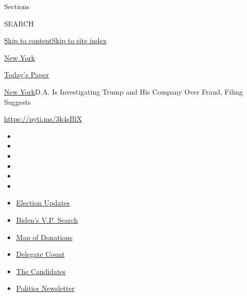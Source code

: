 Sections

SEARCH

\protect\hyperlink{site-content}{Skip to
content}\protect\hyperlink{site-index}{Skip to site index}

\href{https://www.nytimes3xbfgragh.onion/section/nyregion}{New York}

\href{https://myaccount.nytimes3xbfgragh.onion/auth/login?response_type=cookie\&client_id=vi}{}

\href{https://www.nytimes3xbfgragh.onion/section/todayspaper}{Today's
Paper}

\href{/section/nyregion}{New York}\textbar{}D.A. Is Investigating Trump
and His Company Over Fraud, Filing Suggests

\url{https://nyti.ms/3k4sBlX}

\begin{itemize}
\item
\item
\item
\item
\item
\item
\end{itemize}

\begin{itemize}
\item
  \href{https://www.nytimes3xbfgragh.onion/2020/08/04/us/elections/primary-election-michigan-arizona-kansas.html?action=click\&pgtype=Article\&state=default\&region=TOP_BANNER\&context=storylines_menu}{Election
  Updates}
\item
  \href{https://www.nytimes3xbfgragh.onion/article/biden-vice-president-2020.html?action=click\&pgtype=Article\&state=default\&region=TOP_BANNER\&context=storylines_menu}{Biden's
  V.P. Search}
\item
  \href{https://www.nytimes3xbfgragh.onion/interactive/2020/07/24/us/politics/trump-biden-campaign-donors.html?action=click\&pgtype=Article\&state=default\&region=TOP_BANNER\&context=storylines_menu}{Map
  of Donations}
\item
  \href{https://www.nytimes3xbfgragh.onion/interactive/2020/us/elections/delegate-count-primary-results.html?action=click\&pgtype=Article\&state=default\&region=TOP_BANNER\&context=storylines_menu}{Delegate
  Count}
\item
  \href{https://www.nytimes3xbfgragh.onion/interactive/2019/us/politics/2020-presidential-candidates.html?action=click\&pgtype=Article\&state=default\&region=TOP_BANNER\&context=storylines_menu}{The
  Candidates}
\item
  \href{https://www.nytimes3xbfgragh.onion/newsletters/politics?action=click\&pgtype=Article\&state=default\&region=TOP_BANNER\&context=storylines_menu}{Politics
  Newsletter}
\end{itemize}

